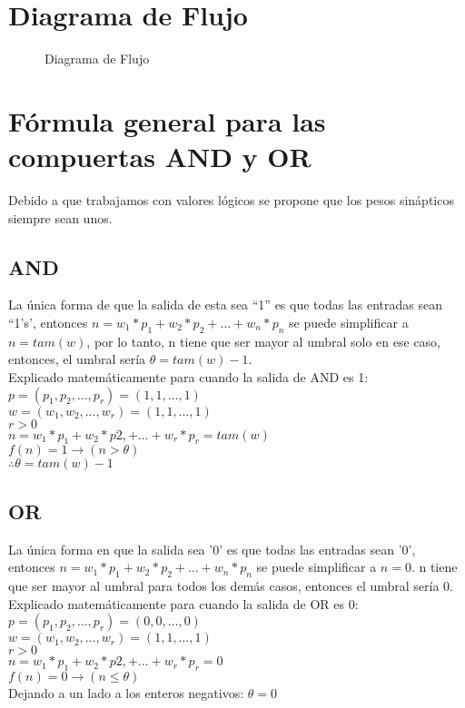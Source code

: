 \documentclass{article}
\begin{document}
\section{Diagrama de Flujo}
\begin{figure}[htpb]
	\centering
	
	\caption{Diagrama de Flujo}
\end{figure}
\section{Fórmula general para las compuertas AND y OR}
Debido a que trabajamos con valores lógicos se propone que los pesos sinápticos siempre sean unos.
\subsection{AND}
La única forma de que la salida de esta sea ``1'' es que todas las entradas sean ``1's', entonces $n=w_1*p_1 + w_2*p_2 + \ldots + w_n*p_n$ se puede simplificar a $n = tam(w)$, por lo tanto, n tiene que ser mayor al umbral solo en ese caso, entonces, el umbral sería $\theta = tam(w) - 1$.\\
Explicado matemáticamente para cuando la salida de AND es 1:\\
$ p = (p_1, p_2, \ldots, p_r) = (1, 1, \ldots, 1)$\\
$ w = (w_1, w_2, \ldots, w_r) = (1, 1, \ldots, 1)$\\
$ r > 0$\\
$ n = w_1*p_1 + w_2*p2, + \ldots +w_r*p_r = tam(w)$\\
$ f(n) = 1 \rightarrow (n > \theta)$\\
$ \therefore \theta = tam(w) - 1$
\subsection{OR}
La única forma en que la salida sea '0' es que todas las entradas sean '0', entonces $ n=w_1*p_1 + w_2*p_2 + \ldots + w_n*p_n$ se puede simplificar a $ n = 0$. n tiene que ser mayor al umbral para todos los demás casos, entonces el umbral sería 0.\\
Explicado matemáticamente para cuando la salida de OR es 0:\\
$ p = (p_1, p_2, \ldots, p_r) = (0, 0, \ldots, 0)$\\
$ w = (w_1, w_2, \ldots, w_r) = (1, 1, \ldots, 1)$\\
$ r > 0$\\
$ n = w_1*p_1 + w_2*p2, + \ldots +w_r*p_r = 0$\\
$ f(n) = 0 \rightarrow (n \leq \theta)$\\
Dejando a un lado a los enteros negativos: $\theta = 0$
\end{document}
